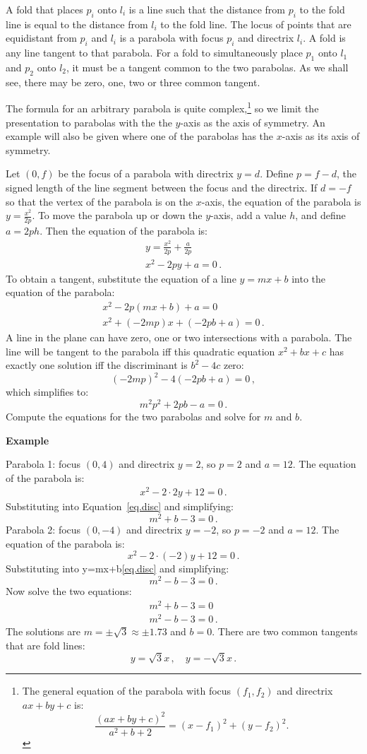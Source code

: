 \documentclass[11pt,a4paper]{article}
\newcommand*{\disfrac}[2]{\displaystyle\frac{#1}{#2}}
\newenvironment{form}[1]{%
\begin{displaymath}%
\renewcommand{\arraystretch}{#1}%
\begin{array}{lcl}}%
{\end{array}%
\end{displaymath}%
}
\begin{document}
A fold that places $p_i$ onto $l_i$ is a line such that the distance from $p_i$ to the fold line is equal to the distance from $l_i$ to the fold line. The locus of points that are equidistant from $p_i$ and $l_i$ is a parabola with focus $p_i$ and directrix $l_i$. A fold is any line tangent to that parabola. For a fold to simultaneously place $p_1$ onto $l_1$ and $p_2$ onto $l_2$, it must be a tangent common to the two parabolas. As we shall see, there may be zero, one, two or three common tangent.

The formula for an arbitrary parabola is quite complex,\footnote{The general equation of the parabola with focus $(f_1,f_2)$ and directrix $ax+by+c$ is:
\[
\disfrac{(ax+by+c)^2}{a^2+b+2} = (x-f_1)^2+(y-f_2)^2.
\]
}
so we limit the presentation to parabolas with the the $y$-axis as the axis of symmetry. An example will also be given where one of the parabolas has the $x$-axis as its axis of symmetry.

Let $(0,f)$ be the focus of a parabola with directrix $y=d$. Define $p=f-d$, the signed length of the line segment between the focus and the directrix. If $d=-f$ so that the vertex of the parabola is on the $x$-axis, the equation of the parabola is $y=\disfrac{x^2}{2p}$. To move the parabola up or down the $y$-axis, add a value $h$, and define $a=2ph$. Then the equation of the parabola is:
\begin{form}{1.5}
y=\disfrac{x^2}{2p}+\disfrac{a}{2p}\\
x^2-2py+a=0\,.
\end{form}
To obtain a tangent, substitute the equation of a line $y=mx+b$ into the equation of the parabola:
\begin{form}{1.5}
x^2-2p(mx+b)+a=0\\
x^2+(-2mp)x+(-2pb+a)=0\,.
\end{form}
A line in the plane can have zero, one or two intersections with a parabola. The line will be tangent to the parabola iff this quadratic equation $x^2+bx+c$ has exactly one solution iff the discriminant is $b^2-4c$ zero:
\[
(-2mp)^2-4(-2pb+a)=0\,,
\]
which simplifies to:
\begin{equation}
m^2p^2+2pb-a=0\,.\label{eq.disc}
\end{equation}
Compute the equations for the two parabolas and solve for $m$ and $b$.


\textbf{Example}

Parabola 1: focus $(0,4)$ and directrix $y=2$, so $p=2$ and $a=12$. The equation of the parabola is:
\[
\begin{array}{l}
x^2-2\cdot 2y +12=0\,.
\end{array}
\]
Substituting into Equation~\ref{eq.disc} and simplifying:
\[
m^2+b-3=0\,.
\]
Parabola 2: focus $(0,-4)$ and directrix $y=-2$, so $p=-2$ and $a=12$. The equation of the parabola is:
\[
x^2-2\cdot (-2)y+12=0\,.
\]
Substituting into y=mx+b\ref{eq.disc} and simplifying:
\[
m^2-b-3=0\,.
\]
Now solve the two equations:
\begin{form}{1.5}
m^2+b-3=0\\
m^2-b-3=0\,.
\end{form}
The solutions are $m=\pm\sqrt{3}\approx \pm 1.73$ and $b=0$. There are two common tangents that are fold lines:
\[
y=\sqrt{3}x\,,\quad y=-\sqrt{3}x\,.
\]
\end{document}
